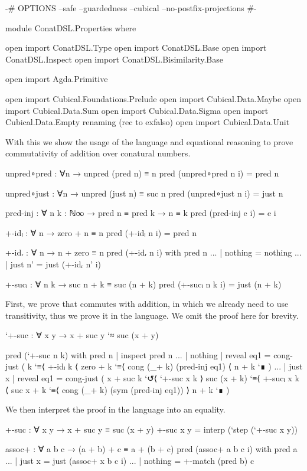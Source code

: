 \begin{code}[hide]
{-# OPTIONS --safe --guardedness --cubical --no-postfix-projections #-}

module ConatDSL.Properties where

open import ConatDSL.Type
open import ConatDSL.Base
open import ConatDSL.Inspect
open import ConatDSL.Bisimilarity.Base

open import Agda.Primitive

open import Cubical.Foundations.Prelude
open import Cubical.Data.Maybe
open import Cubical.Data.Sum
open import Cubical.Data.Sigma
open import Cubical.Data.Empty
  renaming (rec to exfalso)
open import Cubical.Data.Unit
\end{code}

With this we show the usage of the language and equational reasoning to prove
commutativity of addition over conatural numbers.
\begin{code}[hide]
unpred∘pred : ∀{n} → unpred (pred n) ≡ n
pred (unpred∘pred {n} i) = pred n

unpred∘just : ∀{n} → unpred (just n) ≡ suc n
pred (unpred∘just {n} i) = just n

pred-inj : ∀ {n k : ℕ∞} → pred n ≡ pred k → n ≡ k
pred (pred-inj e i) = e i

+-idₗ : ∀ n → zero + n ≡ n
pred (+-idₗ n i) = pred n

+-idᵣ : ∀ n → n + zero ≡ n
pred (+-idᵣ n i) with pred n
... | nothing = nothing
... | just n' = just (+-idᵣ n' i)

+-sucₗ : ∀ n k → suc n + k ≡ suc (n + k)
pred (+-sucₗ n k i) = just (n + k)
\end{code}

First, we prove that  commutes with addition, in which we
already need to use transitivity, thus we prove it in the language. We omit the
proof here for brevity.
\begin{code}
`+-suc : ∀ x y → x + suc y `≈ suc (x + y)
\end{code}
\begin{code}[hide]
pred (`+-suc n k) with pred n | inspect pred n
... | nothing | reveal eq1 = cong-just (
  k
    `≡⟨ +-idₗ k ⟨
  zero + k
    `≡⟨ cong (_+ k) (pred-inj eq1) ⟨
  n + k `∎
  )
... | just x  | reveal eq1 = cong-just (
  x + suc k
    `↺⟨ `+-suc x k ⟩
  suc (x + k)
    `≡⟨ +-sucₗ x k ⟨
  suc x + k
    `≡⟨ cong (_+ k) (sym (pred-inj eq1)) ⟩
  n + k `∎
  )
\end{code}
We then interpret the proof in the language into an equality.
\begin{code}
+-suc : ∀ x y → x + suc y ≡ suc (x + y)
+-suc x y = interp (`step (`+-suc x y))
\end{code}
\begin{code}[hide]
assoc+ : ∀ a b c → (a + b) + c ≡ a + (b + c)
pred (assoc+ a b c i) with pred a
... | just x = just (assoc+ x b c i)
... | nothing = +-match (pred b) c
\end{code}

